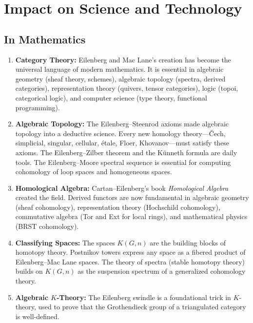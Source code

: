 \section{Impact on Science and Technology}

\subsection{In Mathematics}

\begin{enumerate}
    \item \textbf{Category Theory:} Eilenberg and Mac Lane's creation has become the universal language of modern mathematics. It is essential in algebraic geometry (sheaf theory, schemes), algebraic topology (spectra, derived categories), representation theory (quivers, tensor categories), logic (topoi, categorical logic), and computer science (type theory, functional programming).
    
    \item \textbf{Algebraic Topology:} The Eilenberg--Steenrod axioms made algebraic topology into a deductive science. Every new homology theory---\v{C}ech, simplicial, singular, cellular, \'etale, Floer, Khovanov---must satisfy these axioms. The Eilenberg--Zilber theorem and the K\"unneth formula are daily tools. The Eilenberg--Moore spectral sequence is essential for computing cohomology of loop spaces and homogeneous spaces.
    
    \item \textbf{Homological Algebra:} Cartan--Eilenberg's book \textit{Homological Algebra} created the field. Derived functors are now fundamental in algebraic geometry (sheaf cohomology), representation theory (Hochschild cohomology), commutative algebra (Tor and Ext for local rings), and mathematical physics (BRST cohomology).
    
    \item \textbf{Classifying Spaces:} The spaces $K(G,n)$ are the building blocks of homotopy theory. Postnikov towers express any space as a fibered product of Eilenberg--Mac Lane spaces. The theory of spectra (stable homotopy theory) builds on $K(G,n)$ as the suspension spectrum of a generalized cohomology theory.
    
    \item \textbf{Algebraic $K$-Theory:} The Eilenberg swindle is a foundational trick in $K$-theory, used to prove that the Grothendieck group of a triangulated category is well-defined.
\end{enumerate}

